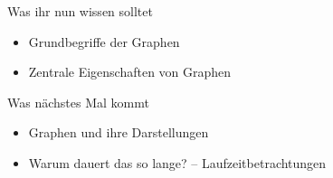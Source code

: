 \begin{frame}	
	\begin{block}{Was ihr nun wissen solltet}
		\begin{itemize}
			\item Grundbegriffe der Graphen
			\item Zentrale Eigenschaften von Graphen
		\end{itemize}
	\end{block}
	
	\begin{block}{Was nächstes Mal kommt}
		\begin{itemize}
			\item Graphen und ihre Darstellungen
			\item Warum dauert das so lange? -- Laufzeitbetrachtungen
		\end{itemize}
	\end{block}
\end{frame}

\slideThanks

